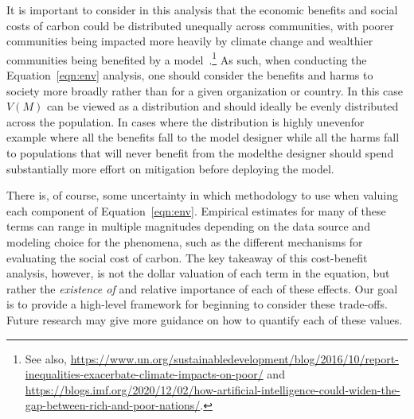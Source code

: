 It is important to consider in this analysis that the economic benefits and social costs of carbon could be distributed unequally across communities, with poorer communities being impacted more heavily by climate change and wealthier communities being benefited by a model~\citep{bender2021}.\footnote{See also, \url{https://www.un.org/sustainabledevelopment/blog/2016/10/report-inequalities-exacerbate-climate-impacts-on-poor/} and \url{https://blogs.imf.org/2020/12/02/how-artificial-intelligence-could-widen-the-gap-between-rich-and-poor-nations/}.} As such, when conducting the Equation~\ref{eqn:env}  analysis, one should consider the benefits and harms to society more broadly rather than for a given organization or country. In this case $V(M)$ can be viewed as a distribution and should ideally be evenly distributed across the population. In cases where the distribution is highly uneven\dash{}for example where all the benefits fall to the model designer while all the harms fall to populations that will never benefit from the model\dash{}the designer should spend substantially more effort on mitigation before deploying the model. 

There is, of course, some uncertainty in which methodology to use when valuing each component of Equation~\ref{eqn:env}. 
Empirical estimates for many of these terms can range in multiple magnitudes depending on the data source and modeling choice for the phenomena, such as the different mechanisms for evaluating the social cost of carbon. The key takeaway of this cost-benefit analysis, however, is not the dollar valuation of each term in the equation, but rather the \emph{existence of} and relative importance of each of these effects. 
Our goal is to provide a high-level framework for beginning to consider these trade-offs. 
Future research may give more guidance on how to quantify each of these values. 

